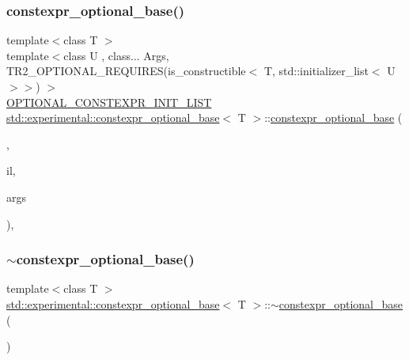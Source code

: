 \subsubsection{\texorpdfstring{constexpr\+\_\+optional\+\_\+base()}{constexpr\_optional\_base()}\hspace{0.1cm}{\footnotesize\ttfamily [5/5]}}
{\footnotesize\ttfamily template$<$class T $>$ \\
template$<$class U , class... Args, T\+R2\+\_\+\+O\+P\+T\+I\+O\+N\+A\+L\+\_\+\+R\+E\+Q\+U\+I\+R\+E\+S(is\+\_\+constructible$<$ T, std\+::initializer\+\_\+list$<$ U $>$$>$) $>$ \\
\mbox{\hyperlink{optional_8h_a7399114ed1c146a67741cdd1f681fcb5}{O\+P\+T\+I\+O\+N\+A\+L\+\_\+\+C\+O\+N\+S\+T\+E\+X\+P\+R\+\_\+\+I\+N\+I\+T\+\_\+\+L\+I\+ST}} \mbox{\hyperlink{structstd_1_1experimental_1_1constexpr__optional__base}{std\+::experimental\+::constexpr\+\_\+optional\+\_\+base}}$<$ T $>$\+::\mbox{\hyperlink{structstd_1_1experimental_1_1constexpr__optional__base}{constexpr\+\_\+optional\+\_\+base}} (\begin{DoxyParamCaption}\item[{\mbox{\hyperlink{structstd_1_1experimental_1_1in__place__t}{in\+\_\+place\+\_\+t}}}]{,  }\item[{std\+::initializer\+\_\+list$<$ U $>$}]{il,  }\item[{Args \&\&...}]{args }\end{DoxyParamCaption})\hspace{0.3cm}{\ttfamily [inline]}, {\ttfamily [explicit]}}

\mbox{\label{structstd_1_1experimental_1_1constexpr__optional__base_aa45afb4ed80eab963e850ca337956a95}} 
\subsubsection{\texorpdfstring{$\sim$constexpr\+\_\+optional\+\_\+base()}{~constexpr\_optional\_base()}}
{\footnotesize\ttfamily template$<$class T $>$ \\
\mbox{\hyperlink{structstd_1_1experimental_1_1constexpr__optional__base}{std\+::experimental\+::constexpr\+\_\+optional\+\_\+base}}$<$ T $>$\+::$\sim$\mbox{\hyperlink{structstd_1_1experimental_1_1constexpr__optional__base}{constexpr\+\_\+optional\+\_\+base}} (\begin{DoxyParamCaption}{ }\end{DoxyParamCaption})\hspace{0.3cm}{\ttfamily [default]}}



